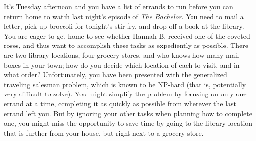 \documentclass[10pt,letterpaper]{article}
\begin{document}
It's Tuesday afternoon and you have a list of errands to run before you can return home to watch last night's episode of \textit{The Bachelor}. You need to mail a letter, pick up broccoli for tonight's stir fry, and drop off a book at the library. You are eager to get home to see whether Hannah B. received one of the coveted roses, and thus want to accomplish these tasks as expediently as possible. There are two library locations, four grocery stores, and who knows how many mail boxes in your town; how do you decide which location of each to visit, and in what order? Unfortunately, you have been presented with the generalized traveling salesman problem, which is known to be NP-hard (that is, potentially very difficult to solve). You might simplify the problem by focusing on only one errand at a time, completing it as quickly as possible from wherever the last errand left you. But by ignoring your other tasks when planning how to complete one, you might miss the opportunity to save time by going to the library location that is further from your house, but right next to a grocery store.


\end{document}
